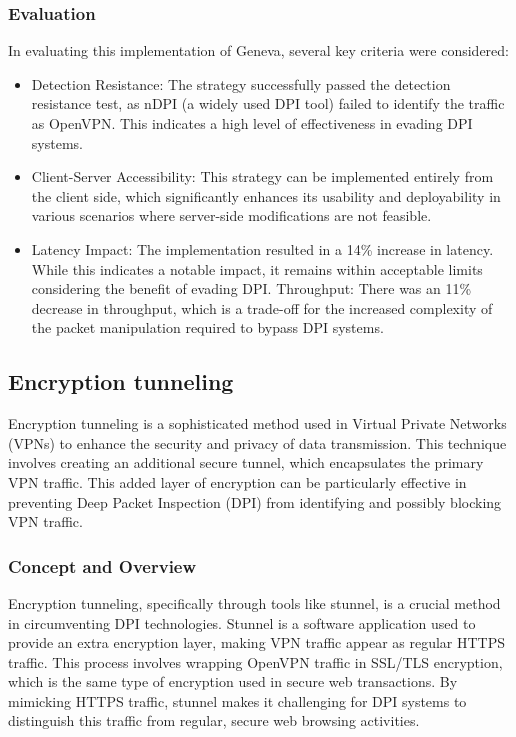 \documentclass[12pt, fleqn, a4paper]{article}
\begin{document}
\subsubsection{Evaluation}
In evaluating this implementation of Geneva, several key criteria were considered:
\begin{itemize}
\item Detection Resistance: The strategy successfully passed the detection resistance test, as nDPI (a widely used DPI tool) failed to identify the traffic as OpenVPN. This indicates a high level of effectiveness in evading DPI systems.
\item Client-Server Accessibility: This strategy can be implemented entirely from the client side, which significantly enhances its usability and deployability in various scenarios where server-side modifications are not feasible.
\item Latency Impact: The implementation resulted in a 14\% increase in latency. While this indicates a notable impact, it remains within acceptable limits considering the benefit of evading DPI.
Throughput: There was an 11\% decrease in throughput, which is a trade-off for the increased complexity of the packet manipulation required to bypass DPI systems.
\end{itemize}

\subsection{Encryption tunneling}
Encryption tunneling is a sophisticated method used in Virtual Private Networks (VPNs) to enhance the security and privacy of data transmission. This technique involves creating an additional secure tunnel, which encapsulates the primary VPN traffic. This added layer of encryption can be particularly effective in preventing Deep Packet Inspection (DPI) from identifying and possibly blocking VPN traffic.
\subsubsection{Concept and Overview}
Encryption tunneling, specifically through tools like stunnel, is a crucial method in circumventing DPI technologies. Stunnel is a software application used to provide an extra encryption layer, making VPN traffic appear as regular HTTPS traffic. This process involves wrapping OpenVPN traffic in SSL/TLS encryption, which is the same type of encryption used in secure web transactions. By mimicking HTTPS traffic, stunnel makes it challenging for DPI systems to distinguish this traffic from regular, secure web browsing activities.
\end{document}
